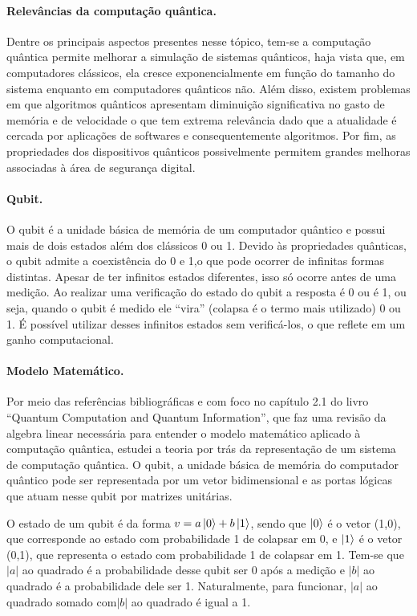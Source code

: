\documentclass{article}
\begin{document}
        \paragraph{Relevâncias da computação quântica.}
        Dentre os principais aspectos presentes nesse tópico, tem-se a computação quântica permite melhorar a simulação de sistemas quânticos, haja vista que, em computadores clássicos, ela cresce exponencialmente em função do tamanho do sistema enquanto em computadores quânticos não. Além disso, existem problemas em que algoritmos quânticos apresentam diminuição significativa no gasto de memória e de velocidade o que tem extrema relevância dado que a atualidade é cercada por aplicações de softwares e consequentemente algoritmos. Por fim, as propriedades dos dispositivos quânticos possivelmente permitem grandes melhoras associadas à área de segurança digital. 

        \paragraph{Qubit.}
        O qubit é a unidade básica de memória de um computador quântico e possui mais de dois estados além dos clássicos 0 ou 1. Devido às propriedades quânticas, o qubit admite a coexistência do 0 e 1,o que pode ocorrer de infinitas formas distintas. Apesar de ter infinitos estados diferentes, isso só ocorre antes de uma medição. Ao realizar uma verificação do estado do qubit a resposta é 0 ou é 1, ou seja, quando o qubit é medido ele ``vira''  (colapsa é o termo mais utilizado) 0 ou 1. É possível utilizar desses infinitos estados sem verificá-los, o que reflete em um ganho computacional.
    
        \paragraph{Modelo Matemático.}
        Por meio das referências bibliográficas e com foco no capítulo 2.1 do livro ``Quantum Computation and Quantum Information'', que faz uma revisão da algebra linear necessária para entender o modelo matemático aplicado à computação quântica, estudei a teoria por trás da representação de um sistema de computação quântica. O qubit, a unidade básica de memória do computador quântico pode ser representada por um vetor bidimensional e as portas lógicas que atuam nesse qubit por matrizes unitárias. 

        O estado de um qubit é da forma $ v = a\ket{0} + b\ket{1}$, sendo que $\ket{0}$ é o vetor (1,0), que corresponde ao estado com probabilidade 1 de colapsar em 0, e $\ket{1}$ é o vetor (0,1), que representa o estado com probabilidade 1 de colapsar em 1. Tem-se que $|a|$ ao quadrado é a probabilidade desse qubit ser 0 após a medição e $|b|$ ao quadrado é a probabilidade dele ser 1. Naturalmente, para funcionar, $|a|$ ao quadrado somado com$|b|$ ao quadrado é igual a 1.
    
\end{document}
